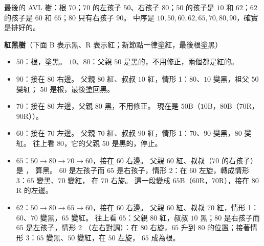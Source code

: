 \begin{pastsoln}
\begin{center}
\end{center}

最後的 AVL 樹：根 $70$；$70$ 的左孩子 $50$、右孩子 $80$；$50$ 的孩子是 $10$ 和 $62$；$62$ 的孩子是
$60$ 和 $65$；$80$ 只有右孩子 $90$。 中序是 $10, 50, 60, 62, 65, 70, 80, 90$，確實是排好的。

\textbf{紅黑樹}（下面 B 表示黑、R 表示紅；新節點一律塗紅，最後根塗黑）
\begin{itemize}
\item $50$：根，塗黑。 $10$、$80$：父親 $50$ 是黑的，不用修正，兩個都是紅的。
\item $90$：接在 $80$ 右邊。 父親 $80$ 紅、叔叔 $10$ 紅，情形 1：$80$、$10$ 變黑，祖父 $50$ 變紅；
$50$ 是根，最後塗回黑。
\item $70$：接在 $80$ 左邊，父親 $80$ 黑，不用修正。 現在是 $50$B（$10$B，$80$B（$70$R，$90$R））。
\item $60$：接在 $70$ 左邊。 父親 $70$ 紅、叔叔 $90$ 紅，情形 1：$70$、$90$ 變黑，$80$ 變紅。 往上看
$80$，它的父親 $50$ 是黑的，停止。
\item $65$：$50 \to 80 \to 70 \to 60$，接在 $60$ 右邊。 父親 $60$ 紅、叔叔（$70$ 的右孩子）是 \NIL，
算黑。 $60$ 是左孩子而 $65$ 是右孩子，情形 2：在 $60$ 左旋，轉成情形 3：$65$ 變黑、$70$ 變紅，
在 $70$ 右旋。 這一段變成 $65$B（$60$R，$70$R），接在 $80$R 的左邊。
\item $62$：$50 \to 80 \to 65 \to 60$，接在 $60$ 右邊。 父親 $60$ 紅、叔叔 $70$ 紅，情形 1：$60$、$70$
變黑，$65$ 變紅。 往上看 $65$：父親 $80$ 紅，叔叔 $10$ 黑；$80$ 是右孩子而 $65$ 是左孩子，情形 2
（左右對調）：在 $80$ 右旋，$65$ 升到 $80$ 的位置；接著情形 3：$65$ 變黑、$50$ 變紅，在 $50$ 左旋，
$65$ 成為根。
\end{itemize}


\end{pastsoln}
